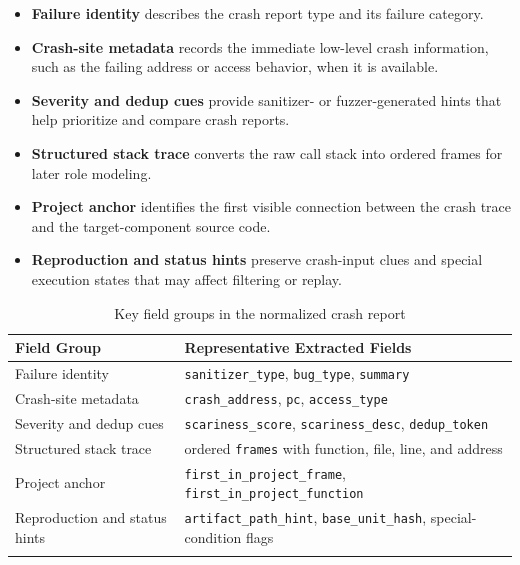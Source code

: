 \documentclass[pdflatex,sn-basic]{sn-jnl}%
\renewcommand{\arraystretch}{1.16}%
\newcommand{\compacttable}{\scriptsize\setlength{\tabcolsep}{2.2pt}\renewcommand{\arraystretch}{1.12}}%
\theoremstyle{thmstyleone}%
\theoremstyle{thmstyletwo}%
\theoremstyle{thmstylethree}%
\begin{document}
\begin{itemize}
    \item \textbf{Failure identity} describes the crash report type and its failure category.
    \item \textbf{Crash-site metadata} records the immediate low-level crash information, such as the failing address or access behavior, when it is available.
    \item \textbf{Severity and dedup cues} provide sanitizer- or fuzzer-generated hints that help prioritize and compare crash reports.
    \item \textbf{Structured stack trace} converts the raw call stack into ordered frames for later role modeling.
    \item \textbf{Project anchor} identifies the first visible connection between the crash trace and the target-component source code.
    \item \textbf{Reproduction and status hints} preserve crash-input clues and special execution states that may affect filtering or replay.
\end{itemize}

\begin{table}[t]
\caption{Key field groups in the normalized crash report}
\label{tab:sanitizer-normalized-fields}
\centering
\compacttable
\setlength{\tabcolsep}{4.0pt}
\renewcommand{\arraystretch}{1.10}
\begin{tabular*}{\linewidth}{@{\extracolsep{\fill}}ll}
\toprule
\textbf{Field Group} & \textbf{Representative Extracted Fields} \\
\midrule
Failure identity & \texttt{sanitizer\_type}, \texttt{bug\_type}, \texttt{summary} \\
Crash-site metadata & \texttt{crash\_address}, \texttt{pc}, \texttt{access\_type} \\
Severity and dedup cues & \texttt{scariness\_score}, \texttt{scariness\_desc}, \texttt{dedup\_token} \\
Structured stack trace & ordered \texttt{frames} with function, file, line, and address \\
Project anchor & \texttt{first\_in\_project\_frame}, \texttt{first\_in\_project\_function} \\
Reproduction and status hints & \texttt{artifact\_path\_hint}, \texttt{base\_unit\_hash}, special-condition flags \\
\botrule
\end{tabular*}
\end{table}
\end{document}
